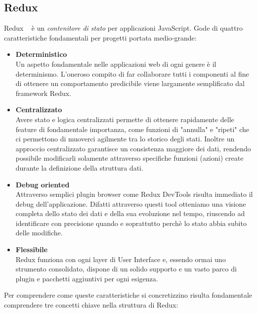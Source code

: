 \subsection{Redux}
Redux ~\cite{caratteristiche_redux} è un \emph{contenitore di stato} per applicazioni JavaScript.\newline
Gode di quattro caratteristiche fondamentali per progetti portata medio-grande:
\begin{itemize}
  \item \textbf{Deterministico}\\
  Un aspetto fondamentale nelle applicazioni web di ogni genere è il determinismo.\newline
  L'oneroso compito di far collaborare tutti i componenti al fine di ottenere un comportamento predicibile viene largamente semplificato dal framework Redux.
  \item \textbf{Centralizzato}\\
  Avere stato e logica centralizzati permette di ottenere rapidamente delle feature di fondamentale importanza, come funzioni di "annulla" e "ripeti" che ci permettono di muoverci agilmente tra lo storico degli stati.\newline
  Inoltre un approccio centralizzato garantisce un consistenza maggiore dei dati, rendendo possibile modificarli solamente attraverso specifiche funzioni (azioni) create durante la definizione della struttura dati.
  \item \textbf{Debug oriented}\\
  Attraverso semplici plugin browser come Redux DevTools risulta immediato il debug dell'applicazione.\newline
  Difatti attraverso questi tool otteniamo una visione completa dello stato dei dati e della sua evoluzione nel tempo, riuscendo ad identificare con precisione quando e soprattutto perchè lo stato abbia subito delle modifiche.
  \item \textbf{Flessibile}\\
  Redux funziona con ogni layer di User Interface e, essendo ormai uno strumento consolidato, dispone di un solido supporto e un vasto parco di plugin e pacchetti aggiuntivi per ogni esigenza.
\end{itemize}
Per comprendere come queste caratteristiche si concretizzino risulta fondamentale comprendere tre concetti chiave nella struttura di Redux:

